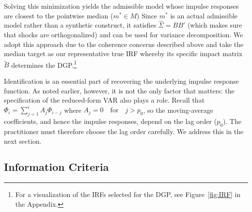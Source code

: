 \documentclass[12pt, a4paper]{article}
\begin{document}
Solving this minimization yields the admissible model whose impulse responses are closest to the pointwise median ($m^{*} \in M$) Since $m^{*}$ is an actual admissible model rather than a synthetic construct, it satisfies $\hat \Sigma = BB'$ (which makes sure that shocks are orthogonalized) and can be used for variance decomposition. We adopt this approach due to the coherence concerns described above and take the median target as our representative true IRF whereby its specific impact matrix $\tilde B$ determines the DGP.\footnote{For a visualization of the IRFs selected for the DGP, see Figure~\ref{fig:IRF} in the Appendix.} 

Identification is an essential part of recovering the underlying impulse response function. As noted earlier, however, it is not the only factor that matters: the specification of the reduced-form VAR also plays a role. Recall that $\Phi_i = \sum_{j=1}^{i} A_j\Phi_{i-j}$ where $A_j = 0 \quad \text{for} \quad j>p_0$, so the moving-average coefficients, and hence the impulse responses, depend on the lag order ($p_0$). The practitioner must therefore choose the lag order carefully. We address this in the next section.

\subsection{Information Criteria}
\label{sec:IC}
\end{document}
